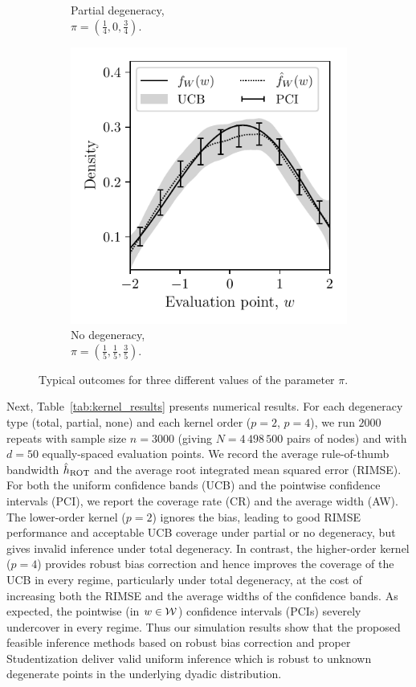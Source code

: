 \begin{figure}[t]
\begin{subfigure}{0.32\textwidth}
    \caption{Partial degeneracy, \\
    $\pi = \left( \frac{1}{4}, 0, \frac{3}{4} \right)$.}
  \end{subfigure}
  \begin{subfigure}{0.32\textwidth}
    \centering
    \includegraphics[scale=0.64]{graphics/outcome_plot_none.pdf}
    \caption{No degeneracy, \\
    $\pi = \left( \frac{1}{5}, \frac{1}{5}, \frac{3}{5} \right)$.}
  \end{subfigure}
  \caption[Typical outcomes for different values of the parameter $\pi$]
  {Typical outcomes for three different values of the parameter $\pi$.}
  \label{fig:kernel_results}
\end{figure}

Next, Table~\ref{tab:kernel_results} presents numerical results. For each
degeneracy
type (total, partial, none) and each kernel order ($p=2$, $p=4$), we run $2000$
repeats with sample size $n=3000$ (giving $N=4\,498\,500$ pairs of nodes) and
with $d=50$ equally-spaced evaluation points. We record the average
rule-of-thumb bandwidth $\hat{h}_{\operatorname{ROT}}$ and the average root integrated mean
squared error (RIMSE). For both the uniform confidence bands (UCB) and the
pointwise confidence intervals (PCI), we report the coverage rate (CR) and the
average width (AW).
%
The lower-order kernel ($p=2$) ignores the bias, leading to good RIMSE
performance and acceptable UCB coverage under partial or no degeneracy, but
gives invalid inference under total degeneracy. In contrast, the higher-order
kernel ($p=4$) provides robust bias correction and hence improves the coverage
of the UCB in every regime, particularly under total degeneracy, at the cost of
increasing both the RIMSE and the average widths of the confidence bands.
%
As expected, the pointwise (in $w\in\mathcal{W}$) confidence intervals (PCIs) severely
undercover in every regime. Thus our simulation results show that the proposed
feasible inference methods based on robust bias correction and proper
Studentization deliver valid uniform inference which is robust to unknown
degenerate points in the underlying dyadic distribution.


